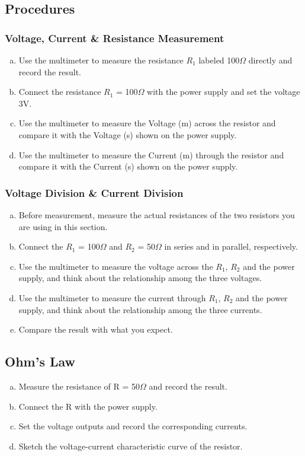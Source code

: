 \documentclass{article}
\begin{document}
\subsection{Procedures}
\subsubsection{Voltage, Current \& Resistance Measurement}
\begin{enumerate}[a)]
\item
Use the multimeter to measure the resistance $R_1$ labeled 100$\Omega$ directly and record the result.
\item
Connect the resistance $R_1$ = 100$\Omega$ with the power supply and set the voltage 3V.
\item
Use the multimeter to measure the Voltage (m) across the resistor and compare it with the Voltage (s) shown on the power supply.
\item
Use the multimeter to measure the Current (m) through the resistor and compare it with the Current (s) shown on the power supply.
\end{enumerate}

\subsubsection{Voltage Division \& Current Division}
\begin{enumerate}[a)]
\item
Before measurement, measure the actual resistances of the two resistors you are using in this section.
\item
Connect the $R_1$ = 100$\Omega$ and $R_2$ = 50$\Omega$ in series and in parallel, respectively.
\item
Use the multimeter to measure the voltage across the $R_1$, $R_2$ and the power supply, and think about the relationship among the three voltages.
\item
Use the multimeter to measure the current through $R_1$, $R_2$ and the power supply, and think about the relationship among the three currents.
\item
Compare the result with what you expect.
\end{enumerate}

\subsection{Ohm’s Law}
\begin{enumerate}[a)]
\item
Measure the resistance of R = 50$\Omega$ and record the result.
\item
Connect the R with the power supply.
\item
Set the voltage outputs and record the corresponding currents.
\item
Sketch the voltage-current characteristic curve of the resistor.
\end{enumerate}
\end{document}
